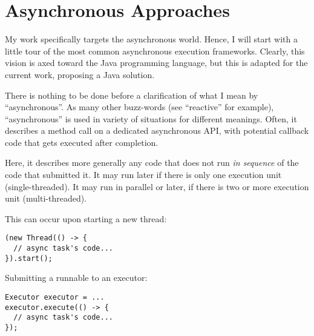 
\chapter{Asynchronous Approaches}
\label{ch:asyncworld}


My work specifically targets the asynchronous world. Hence, I will start with a little tour of the most common asynchronous execution frameworks. Clearly, this vision is axed toward the Java programming language, but this is adapted for the current work, proposing a Java solution.

There is nothing to be done before a clarification of what I mean by ``asynchronous''. As many other buzz-words (see ``reactive'' for example), ``asynchronous'' is used in variety of situations for different meanings. Often, it describes a method call on a dedicated asynchronous API, with potential callback code that gets executed after completion. %

Here, it describes more generally any code that does not run \emph{in sequence} of the code that submitted it. It may run later if there is only one execution unit (single-threaded). It may run in parallel or later, if there is two or more execution unit (multi-threaded).

This can occur upon starting a new thread:

\begin{lstlisting}
(new Thread(() -> {
  // async task's code...
}).start();
\end{lstlisting}

Submitting a runnable to an executor:

\begin{lstlisting}
Executor executor = ...
executor.execute(() -> {
  // async task's code...
});
\end{lstlisting}

